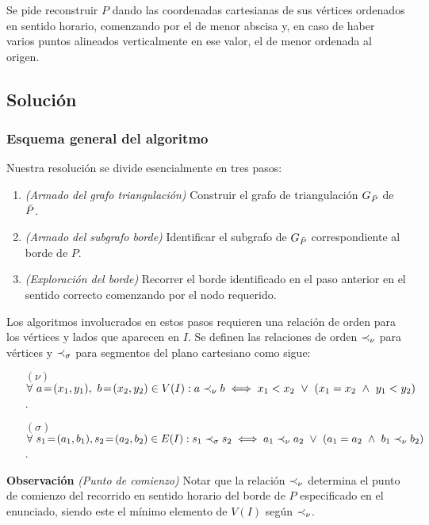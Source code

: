 \medskip

Se pide reconstruir $P$ dando las coordenadas cartesianas de sus vértices ordenados en sentido horario, comenzando por el de menor abscisa y, en caso de haber varios puntos alineados verticalmente en ese valor, el de menor ordenada al origen.

\subsection{Solución}

\subsubsection{Esquema general del algoritmo}

Nuestra resolución se divide esencialmente en tres pasos:

\begin{enumerate}
\setlength\itemsep{0em}
\item \textit{(Armado del grafo triangulación)} Construir el grafo de triangulación $G_{\bar{P}}$ de $\bar{P}$.
\item \textit{(Armado del subgrafo borde)} Identificar el subgrafo de $G_{\bar{P}}$ correspondiente al borde de $P$.
\item \textit{(Exploración del borde)} Recorrer el borde identificado en el paso anterior en el sentido correcto comenzando por el nodo requerido.
\end{enumerate}

Los algoritmos involucrados en estos pasos requieren una relación de orden para los vértices y lados que aparecen en $I$. Se definen las relaciones de orden $\prec_{\nu}$ para vértices y $\prec_{\sigma}$ para segmentos del plano cartesiano como sigue:

\begin{itemize}
\item[$( \nu )$] $\forall \ a\!=\!(x_1,y_1), \ b\!=\!(x_2,y_2) \in V(I): a \lessv b \iff x_1 < x_2 \ \vee \ (x_1 = x_2 \ \wedge \ y_1 < y_2)$.
\item[$( \sigma )$] $\forall \ s_1\!=\!(a_1,b_1), s_2\!=\!(a_2,b_2) \in E(I): s_1 \lesse s_2 \iff a_1 \lessv a_2 \ \vee \ (a_1 = a_2 \ \wedge \ b_1 \lessv b_2)$.
\end{itemize}

\textbf{Observación} \textit{(Punto de comienzo)} Notar que la relación $\prec_{\nu}$ determina el punto de comienzo del recorrido en sentido horario del borde de $P$ especificado en el enunciado, siendo este el mínimo elemento de $V(I)$ según $\prec_{\nu}$.

